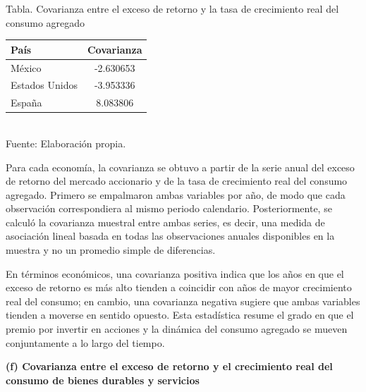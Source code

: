 \documentclass{article}\usepackage[]{graphicx}\usepackage[]{xcolor}
\begin{document}
\begin{center}
Tabla. Covarianza entre el exceso de retorno y la tasa de crecimiento real del consumo agregado
\end{center}
\begin{center}

\begin{tabular}{lc}
\toprule
País & Covarianza\\
\midrule
México & -2.630653\\
Estados Unidos & -3.953336\\
España & 8.083806\\
\bottomrule
\end{tabular}
\\[0.3em]
{\footnotesize Fuente: Elaboración propia.}
\end{center}


Para cada economía, la covarianza se obtuvo a partir de la serie anual del exceso de retorno del mercado accionario y de la tasa de crecimiento real del consumo agregado. Primero se empalmaron ambas variables por año, de modo que cada observación correspondiera al mismo periodo calendario. Posteriormente, se calculó la covarianza muestral entre ambas series, es decir, una medida de asociación lineal basada en todas las observaciones anuales disponibles en la muestra y no un promedio simple de diferencias.

En términos económicos, una covarianza positiva indica que los años en que el exceso de retorno es más alto tienden a coincidir con años de mayor crecimiento real del consumo; en cambio, una covarianza negativa sugiere que ambas variables tienden a moverse en sentido opuesto. Esta estadística resume el grado en que el premio por invertir en acciones y la dinámica del consumo agregado se mueven conjuntamente a lo largo del tiempo.

\newpage
\textbf{(f) Covarianza entre el exceso de retorno y el crecimiento real del consumo de bienes durables y servicios}
\end{document}
